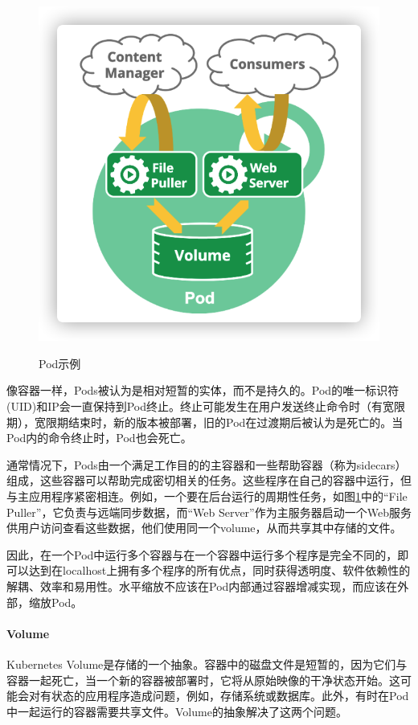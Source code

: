 \documentclass[macfonts,master]{njuthesis}
\begin{document}
\begin{figure}[htbp]
  \centering
  \includegraphics[width= 1\textwidth]{pics/pod.png}\\
  \caption{Pod示例}\label{fig:pod}
\end{figure}

像容器一样，Pods被认为是相对短暂的实体，而不是持久的。Pod的唯一标识符(UID)和IP会一直保持到Pod终止。终止可能发生在用户发送终止命令时（有宽限期），宽限期结束时，新的版本被部署，旧的Pod在过渡期后被认为是死亡的。当Pod内的命令终止时，Pod也会死亡\cite{k8sconcepts}。

通常情况下，Pods由一个满足工作目的的主容器和一些帮助容器（称为sidecars）组成，这些容器可以帮助完成密切相关的任务。这些程序在自己的容器中运行，但与主应用程序紧密相连\cite{introk8s}。例如，一个要在后台运行的周期性任务，如图\ref{fig:pod}中的“File Puller”，它负责与远端同步数据，而“Web Server”作为主服务器启动一个Web服务供用户访问查看这些数据，他们使用同一个volume，从而共享其中存储的文件。

因此，在一个Pod中运行多个容器与在一个容器中运行多个程序是完全不同的，即可以达到在localhost上拥有多个程序的所有优点，同时获得透明度、软件依赖性的解耦、效率和易用性。水平缩放不应该在Pod内部通过容器增减实现，而应该在外部，缩放Pod\cite{k8sconcepts}。

\paragraph{Volume}
Kubernetes Volume是存储的一个抽象。容器中的磁盘文件是短暂的，因为它们与容器一起死亡，当一个新的容器被部署时，它将从原始映像的干净状态开始。这可能会对有状态的应用程序造成问题，例如，存储系统或数据库。此外，有时在Pod中一起运行的容器需要共享文件。Volume的抽象解决了这两个问题。
\end{document}
